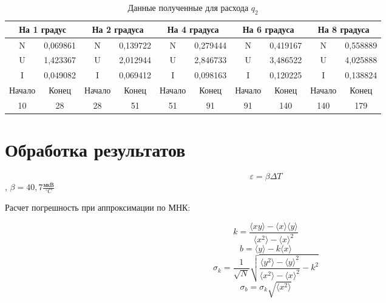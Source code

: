 \documentclass[a4paper, 12pt]{article}
\begin{document}
\begin{table}[!ht]
    \centering
\begin{tabular}{|cc|cc|cc|cc|cc|}
\hline
\multicolumn{2}{|c|}{На 1 градус}       & \multicolumn{2}{c|}{На 2 градуса}      & \multicolumn{2}{c|}{На 4 градуса}      & \multicolumn{2}{c|}{На 6 градуса}      & \multicolumn{2}{c|}{На 8 градуса}      \\ \hline
\multicolumn{1}{|c|}{N}      & 0,069861 & \multicolumn{1}{c|}{N}      & 0,139722 & \multicolumn{1}{c|}{N}      & 0,279444 & \multicolumn{1}{c|}{N}      & 0,419167 & \multicolumn{1}{c|}{N}      & 0,558889 \\ \hline
\multicolumn{1}{|c|}{U}      & 1,423367 & \multicolumn{1}{c|}{U}      & 2,012944 & \multicolumn{1}{c|}{U}      & 2,846733 & \multicolumn{1}{c|}{U}      & 3,486522 & \multicolumn{1}{c|}{U}      & 4,025888 \\ \hline
\multicolumn{1}{|c|}{I}      & 0,049082 & \multicolumn{1}{c|}{I}      & 0,069412 & \multicolumn{1}{c|}{I}      & 0,098163 & \multicolumn{1}{c|}{I}      & 0,120225 & \multicolumn{1}{c|}{I}      & 0,138824 \\ \hline
\multicolumn{1}{|c|}{Начало} & Конец    & \multicolumn{1}{c|}{Начало} & Конец    & \multicolumn{1}{c|}{Начало} & Конец    & \multicolumn{1}{c|}{Начало} & Конец    & \multicolumn{1}{c|}{Начало} & Конец    \\ \hline
\multicolumn{1}{|c|}{10}     & 28       & \multicolumn{1}{c|}{28}     & 51       & \multicolumn{1}{c|}{51}     & 91       & \multicolumn{1}{c|}{91}     & 140      & \multicolumn{1}{c|}{140}    & 179      \\ \hline
\end{tabular}
    \caption{Данные полученные для расхода $q_2$}
    \label{fig:table_to_this_foto}
\end{table}

\section{Обработка результатов}

\begin{equation}
    \varepsilon = \beta \Delta T
\end{equation}
, $\beta = 40,7 \frac{\text{мкВ}}{^{\circ}C}$

Расчет погрешность при аппроксимации по МНК:

\[k=\frac{\langle xy\rangle-\langle x\rangle \langle y\rangle}{\langle x^2\rangle - \langle x\rangle^2}\]
\[b = \langle y \rangle - k \langle x \rangle\]
\[\sigma_{k} = \frac{1}{\sqrt{N}}\sqrt{\frac{\langle y^2 \rangle - \langle y \rangle ^2}{\langle x^2 \rangle - \langle x \rangle ^2} - k^2}\]
\[\sigma_{b} = \sigma_{k}\sqrt{\langle x^2 \rangle}\]
\end{document}
